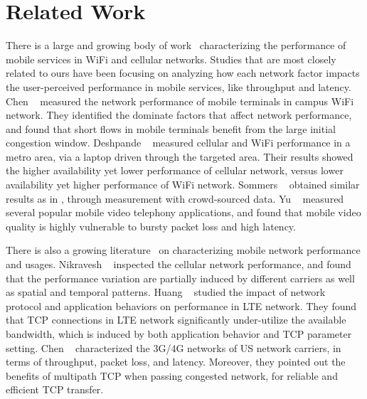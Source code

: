 
\section{Related Work}
\label{sec:related}

There is a large and growing body of work~\cite{chen2012network,deshpande2010performance,sommers2012cell,sharma2010goodput,yu2014can} characterizing the performance of mobile services in WiFi and cellular networks. Studies that are most closely related to ours have been focusing on analyzing how each network factor impacts the user-perceived performance in mobile services, like throughput and latency. Chen \etal~\cite{chen2012network} measured the network performance of mobile terminals in campus WiFi network. They identified the dominate factors that affect network performance, and found that short flows in mobile terminals benefit from the large initial congestion window. Deshpande \etal~\cite{deshpande2010performance} measured cellular and WiFi performance in a metro area, via a laptop driven through the targeted area. Their results showed the higher availability yet lower performance of cellular network, versus lower availability yet higher performance of WiFi network. Sommers \etal~\cite{sommers2012cell} obtained similar results as in \cite{deshpande2010performance}, through measurement with crowd-sourced data. Yu \etal~\cite{yu2014can} measured several popular mobile video telephony applications, and found that mobile video quality is highly vulnerable to bursty packet loss and high latency. 

There is also a growing literature~\cite{nikravesh2014mobile,deng2014wifi,huang2013depth,UM-CS-2012-022} on characterizing mobile network performance and usages. Nikravesh \etal~\cite{nikravesh2014mobile} inspected the cellular network performance, and found that the performance variation are partially induced by different carriers as well as spatial and temporal patterns. Huang \etal~\cite{huang2013depth} studied the impact of network protocol and application behaviors on performance in LTE network. They found that TCP connections in LTE network significantly under-utilize the available bandwidth, which is induced by both application behavior and TCP parameter setting. Chen \etal~\cite{UM-CS-2012-022} characterized the 3G/4G networks of US network carriers, in terms of throughput, packet loss, and latency. Moreover, they pointed out the benefits of multipath TCP when passing congested network, for reliable and efficient TCP transfer.

